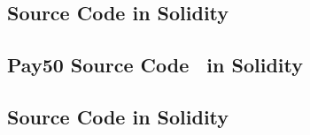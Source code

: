 
\subsection{\ew Source Code in Solidity}
\label{sec:code}


\clearpage

\subsection{\textsf{Pay50} Source Code~\cite{DF17} in Solidity}
\label{sec:pay50}


\newpage

\subsection{\eww Source Code in Solidity}
\label{sec:eww}















